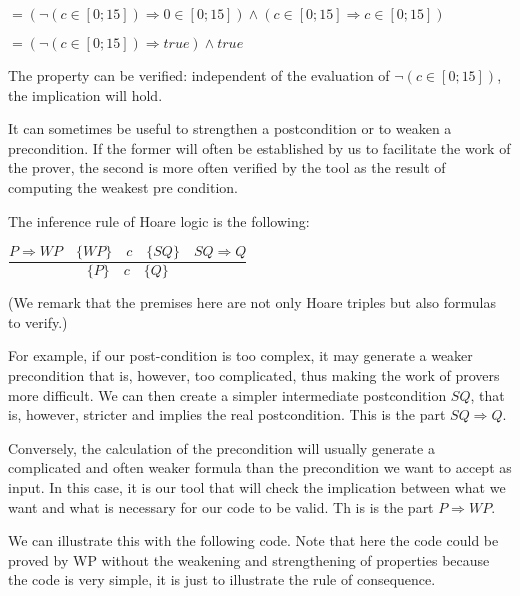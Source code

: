 \documentclass[middle]{zmdocument}
\begin{document}
$= (\neg (c \in [0;15]) \Rightarrow 0 \in [0;15]) \wedge (c \in [0;15] \Rightarrow c \in [0;15])$



$= (\neg (c \in [0;15]) \Rightarrow true) \wedge true$



The property can be verified: independent of the evaluation of
$\neg (c \in [0;15])$, the implication will hold.







It can sometimes be useful to strengthen a postcondition or to weaken a
precondition. If the former will often be established by us to
facilitate the work of the prover, the second is more often verified by
the tool as the result of computing the weakest pre condition.



The inference rule of Hoare logic is the following:




\begin{center}
$\dfrac{P \Rightarrow WP \quad \{WP\}\quad c\quad \{SQ\} \quad SQ \Rightarrow Q}{\{P\}\quad c \quad \{Q\}}$


\end{center}


(We remark that the premises here are not only Hoare triples but also
formulas to verify.)

For example, if our post-condition is too complex, it may generate a
weaker precondition that is, however, too complicated, thus making the
work of provers more difficult. We can then create a simpler
intermediate postcondition $SQ$, that is, however, stricter and
implies the real postcondition. This is the part $SQ \Rightarrow Q$.

Conversely, the calculation of the precondition will usually generate a
complicated and often weaker formula than the precondition we want to
accept as input. In this case, it is our tool that will check the
implication between what we want and what is necessary for our code to
be valid. Th is is the part $P \Rightarrow WP$.

We can illustrate this with the following code. Note that here the code
could be proved by WP without the weakening and strengthening of
properties because the code is very simple, it is just to illustrate the
rule of consequence.
\end{document}
